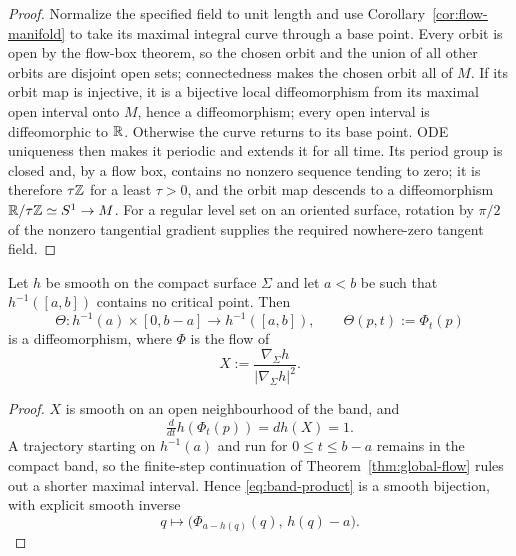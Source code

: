 \begin{proof}
Normalize the specified field to unit length and use
Corollary~\ref{cor:flow-manifold} to take its maximal integral curve through a
base point.  Every orbit is open by the flow-box theorem, so the chosen orbit
and the union of all other orbits are disjoint open sets; connectedness makes
the chosen orbit all of $M$.  If its orbit map is injective, it is a bijective
local diffeomorphism from its maximal open interval onto $M$, hence a
diffeomorphism; every open interval is diffeomorphic to $\mathbb R$.  Otherwise the
curve returns to its base point.  ODE uniqueness then makes it periodic and
extends it for all time.  Its period group is closed and, by a flow box,
contains no nonzero sequence tending to zero; it is therefore $\tau\mathbb Z$ for a
least $\tau>0$, and the orbit map descends to a diffeomorphism
$\mathbb R/\tau\mathbb Z\simeq S^1\to M$.  For a regular level set on an oriented surface,
rotation by $\pi/2$ of the nonzero tangential gradient supplies the required
nowhere-zero tangent field.
\end{proof}

\begin{lemma}\label{lem:morse-band}
Let $h$ be smooth on the compact surface $\Sigma$ and let $a<b$ be such that
$h^{-1}([a,b])$ contains no critical point.  Then
\begin{equation}\label{eq:band-product}
  \Theta:h^{-1}(a)\times[0,b-a]\to h^{-1}([a,b]),
  \qquad
  \Theta(p,t):=\Phi_t(p)
\end{equation}
is a diffeomorphism, where $\Phi$ is the flow of
\begin{equation}\label{eq:band-field}
  X:=\frac{\nabla_\Sigma h}{|\nabla_\Sigma h|^2}.
\end{equation}
\end{lemma}

\begin{proof}
$X$ is smooth on an open neighbourhood of the band, and
\begin{equation}\label{eq:band-derivative}
  \tfrac{d}{dt}h(\Phi_t(p))=dh(X)=1 .
\end{equation}
A trajectory starting on $h^{-1}(a)$ and run for $0\le t\le b-a$ remains in
the compact band, so the finite-step continuation of
Theorem~\ref{thm:global-flow} rules out a shorter maximal interval.  Hence
\eqref{eq:band-product} is a smooth bijection, with explicit smooth inverse
\begin{equation}\label{eq:band-inverse}
  q\longmapsto\bigl(\Phi_{a-h(q)}(q),\,h(q)-a\bigr).
\end{equation}
\end{proof}

